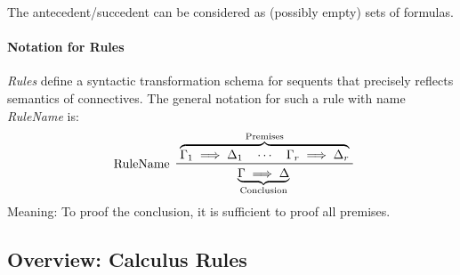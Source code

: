 		The antecedent/succedent can be considered as (possibly empty) sets of formulas.


	\paragraph{Notation for Rules}
		\textit{Rules} define a syntactic transformation schema for sequents that precisely reflects semantics of connectives. The general notation for such a rule with name \textit{RuleName} is:
		\begin{equation*}
			\prftree[l]
			{ RuleName }
			{ \overbrace{\Gamma_1 \implies \Delta_1 \quad\cdots\quad \Gamma_r \implies \Delta_r}^\textrm{Premises} }
			{ \underbrace{\Gamma \implies \Delta}_\textrm{Conclusion} }
		\end{equation*}
		Meaning: To proof the conclusion, it is sufficient to proof all premises.

	\subsection{Overview: Calculus Rules}
